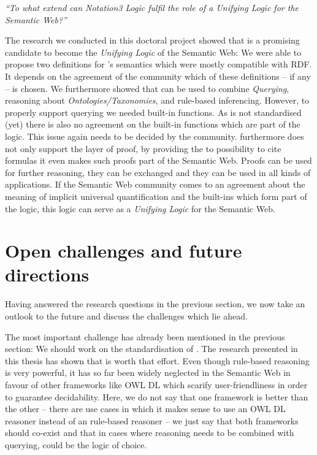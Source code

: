 \textit{ 
``To what extend can Notation3 Logic fulfil the role of a \emph{Unifying Logic} for the Semantic Web?''
}

The research we conducted in this doctoral project showed that \nthreelogic is a promising candidate to become the \emph{Unifying Logic} of the Semantic Web:
We were able to propose two definitions for \nthree's semantics which were mostly compatible with RDF. It depends on the agreement of the community which 
of these definitions -- if any -- is chosen.
We furthermore showed that \nthree can be used to combine \emph{Querying}, reasoning about \emph{Ontologies/Taxonomies}, and rule-based inferencing. 
However, to properly support querying we  needed 
built-in functions. As \nthree is not standardised (yet) there is also no agreement on the built-in functions which are part of the logic. This  issue again 
needs to be decided by the community. 
\nthree  furthermore does not only support the layer of proof, by providing the to possibility to cite formulas it even makes such proofs part of the Semantic Web.
Proofs can be used for further reasoning, they can be exchanged and they can be used in all kinds of applications.
If the Semantic Web community comes to an agreement about the meaning of implicit universal quantification and the built-ins which form part of the logic, this logic 
can serve as a \emph{Unifying Logic} for the Semantic Web.




\section{Open challenges and future directions}
Having answered the research questions in the previous section, we now take an outlook to the future and discuss the challenges which lie ahead. 

The most important challenge 
has already been mentioned in the previous section: We should work on the standardisation of \nthree.
The research presented in this thesis has shown that \nthree is worth that effort. 
Even though rule-based reasoning is very powerful, it has so far been widely neglected in the Semantic Web in favour of other frameworks like OWL DL which 
scarify user-friendliness in order to guarantee decidability. %
Here, we do not say that one framework is better than the other -- there are use cases in which it makes sense to use an OWL DL reasoner instead of an 
rule-based reasoner -- we just say that both frameworks should co-exist and that in cases where reasoning needs to be combined with querying, \nthree could be 
the logic of choice. 

